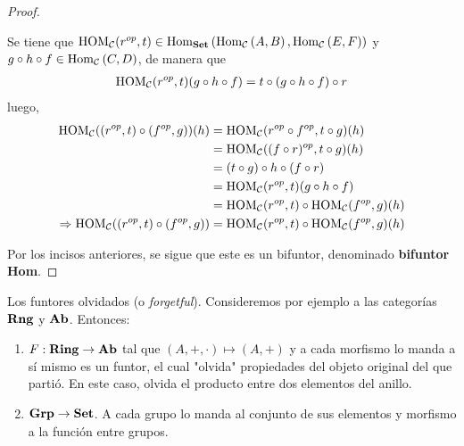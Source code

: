 \documentclass[12pt]{report}
\theoremstyle{largebreak}
\newcommand\cf[3]{\ensuremath{#1:#2\rightarrow#3}}
\newcommand{\Hom}[3]{\ensuremath{\textup{Hom}_{#1}\left(#2,#3\right)}}
\newcommand{\Cat}[1]{\ensuremath{\textup{\textbf{#1}}}}
\begin{document}
\begin{proof}
\begin{enumerate}
            Se tiene que $\HOM{\mathcal{C}}(r^{op},t)\in\Hom{\Cat{Set}}{\Hom{\mathcal{C}}{A}{B}}{\Hom{\mathcal{C}}{E}{F}}$ y $g\circ h\circ f\in \Hom{\mathcal{C}}{C}{D}$, de manera que
            \begin{equation*}
                \begin{split}
                    \textup{HOM}_{\mathcal{C}}(r^{op},t)(g\circ h\circ f)&=t\circ (g\circ h\circ f)\circ r\\                    
                \end{split}
            \end{equation*}
            luego,
            \begin{equation*}
                \begin{split}
                    \textup{HOM}_{\mathcal{C}}((r^{op},t)\circ (f^{op},g))(h)
                    &=\textup{HOM}_{\mathcal{C}}(r^{op}\circ f^{op},t\circ g)(h)\\
                    &=\textup{HOM}_{\mathcal{C}}((f\circ r)^{op},t\circ g)(h)\\
                    &=(t\circ g)\circ h\circ (f\circ r)\\
                    &=\textup{HOM}_{\mathcal{C}}(r^{op}, t)(g\circ h\circ f)\\
                    &=\textup{HOM}_{\mathcal{C}}(r^{op},t)\circ\textup{HOM}_{\mathcal{C}}(f^{op},g)(h)\\
                    \Rightarrow \textup{HOM}_{\mathcal{C}}((r^{op},t)\circ (f^{op},g))&=\textup{HOM}_{\mathcal{C}}(r^{op},t)\circ\textup{HOM}_{\mathcal{C}}(f^{op},g)(h)\\
                \end{split}
            \end{equation*}
        \end{enumerate}
        Por los incisos anteriores, se sigue que este es un bifuntor, denominado \textbf{bifuntor Hom}.
    \end{proof}

    \begin{exa}
        Los funtores olvidados (o \textit{forgetful}). Consideremos por ejemplo a las categorías $\Cat{Rng}$ y $\Cat{Ab}$. Entonces:
        \begin{enumerate}
            \item $\cf{F}{\Cat{Ring}}{\Cat{Ab}}$ tal que $(A,+,\cdot)\mapsto (A,+)$ y a cada morfismo lo manda a sí mismo es un funtor, el cual "olvida" propiedades del objeto original del que partió. En este caso, olvida el producto entre dos elementos del anillo.
            \item $\Cat{Grp}\rightarrow\Cat{Set}$. A cada grupo lo manda al conjunto de sus elementos y morfismo a la función entre grupos.
        \end{enumerate}
    \end{exa}
\end{document}
